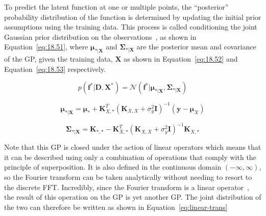 \documentclass[12pt]{article}
\begin{document}
    To predict the latent function at one or multiple points, the ``posterior'' probability distribution of the function is determined by updating the initial prior assumptions using the training data.
    This process is called conditioning the joint Gaussian prior distribution on the observations~\cite{rasmussen2006gaussian}, as shown in Equation~\ref{eq:18.51}, where $\boldsymbol{\mu}_{*\vert \mathbf{X}}$ and $\boldsymbol{\Sigma}_{*\vert \mathbf{X}}$ are the posterior mean and covariance of the GP, given the training data, $\mathbf{X}$ as shown in Equation~\ref{eq:18.52} and Equation~\ref{eq:18.53} respectively.

    \begin{equation}
        p(\mathbf{f}^* \vert \mathbf{D}, \mathbf{X}^*) = \mathcal{N}(\mathbf{f}^* \vert \boldsymbol{\mu}_{*\vert \mathbf{X}}, \boldsymbol{\Sigma}_{*\vert \mathbf{X}})\label{eq:18.51}
    \end{equation}

    \begin{equation}
        \boldsymbol{\mu}_{*\vert \mathbf{X}} = \boldsymbol{\mu}_* + \mathbf{K}_{X,*}^T (\mathbf{K}_{X,X} + \sigma^2_y \mathbf{I})^{-1} (\mathbf{y} - \boldsymbol{\mu}_X)\label{eq:18.52}
    \end{equation}

    \begin{equation}
        \boldsymbol{\Sigma}_{*\vert \mathbf{X}} = \mathbf{K}_{*,*} - \mathbf{K}_{X,*}^T (\mathbf{K}_{X,X} + \sigma^2_y \mathbf{I})^{-1} \mathbf{K}_{X,*}\label{eq:18.53}
    \end{equation}


    Note that this GP is closed under the action of linear operators which means that it can be described using only a combination of operations that comply with the principle of superposition.
    It is also defined in the continuous domain $(-\infty, \infty)$, so the Fourier transform can be taken analytically without needing to resort to the discrete FFT\@.
    Incredibly, since the Fourier transform is a linear operator~\cite{Jidling2017}, the result of this operation on the GP is yet another GP. The joint distribution of the two can therefore be written as shown in Equation~\ref{eq:linear-trans}
\end{document}
